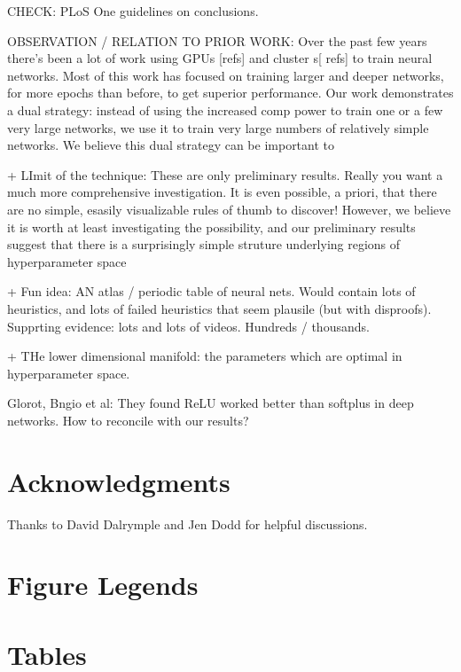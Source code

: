 \documentclass[10pt]{article}
\begin{document}
CHECK: PLoS One guidelines on conclusions.

OBSERVATION / RELATION TO PRIOR WORK: Over the past few years there's
been a lot of work using GPUs [refs] and cluster s[ refs] to train
neural networks.  Most of this work has focused on training larger and
deeper networks, for more epochs than before, to get superior
performance.  Our work demonstrates a dual strategy: instead of using
the increased comp power to train one or a few very large networks, we
use it to train very large numbers of relatively simple networks.  We
believe this dual strategy can be important to

+ LImit of the technique: These are only preliminary results.  Really
you want a much more comprehensive investigation.  It is even
possible, a priori, that there are no simple, esasily visualizable
rules of thumb to discover!  However, we believe it is worth at least
investigating the possibility, and our preliminary results suggest
that there is a surprisingly simple struture underlying regions of
hyperparameter space

+ Fun idea: AN atlas / periodic table of neural nets.  Would contain
lots of heuristics, and lots of failed heuristics that seem plausile
(but with disproofs).  Supprting evidence: lots and lots of videos.
Hundreds / thousands.

+ THe lower dimensional manifold: the parameters which are optimal in
hyperparameter space.


Glorot, Bngio et al: They found ReLU worked better than softplus in
deep networks.  How to reconcile with our results?

\section*{Acknowledgments}

Thanks to David Dalrymple and Jen Dodd for helpful discussions.



\section*{Figure Legends}


\section*{Tables}
\end{document}
